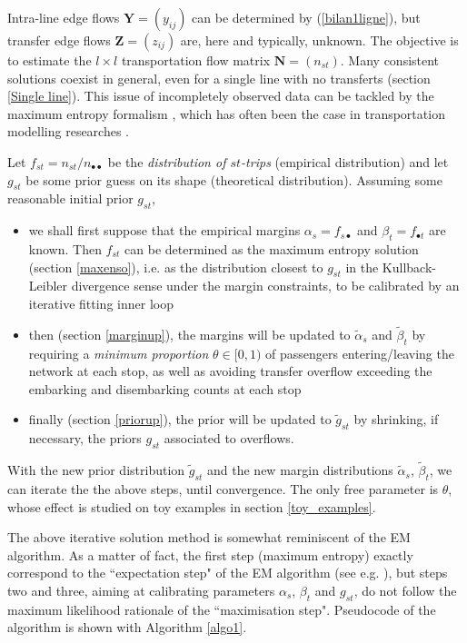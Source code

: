\documentclass{bmcart}
\begin{document}
Intra-line edge flows $\mathbf{Y}=(y_{ij})$ can be determined by (\ref{bilan1ligne}), but transfer edge flows $\mathbf{Z}=(z_{ij})$ are, here and typically, unknown. The objective is to estimate the $l\times l$ transportation flow matrix $\mathbf{N}=(n_{st})$. Many consistent solutions coexist in general, even for a single line with no transferts (section \ref{Single line}). This issue of incompletely observed data can be tackled by the maximum entropy formalism \cite{jaynes1957information}, which has often been the case in transportation modelling researches \cite{wilson1967statistical}  \cite{erlander1990gravity}. 



Let $f_{st}=n_{st}/n_{\bullet\bullet}$ be the \emph{distribution of $st$-trips} (empirical distribution) and let $g_{st}$ be some prior guess on its shape (theoretical distribution). 
Assuming some reasonable initial prior $g_{st}$, 
\begin{itemize}
\item[(1)] we shall first suppose that the empirical margins $\alpha_s=f_{s\bullet}$ and $\beta_t=f_{\bullet t}$ are known.  
Then $f_{st}$ can be determined as the maximum entropy solution (section \ref{maxenso}), i.e. as the distribution closest to $g_{st}$ in the Kullback-Leibler divergence sense under the margin constraints, to be calibrated by an iterative fitting inner loop
\item[(2)] then (section \ref{marginup}), the margins will be updated to $\tilde{\alpha}_s$ and $\tilde{\beta}_t$   by requiring a \emph{minimum proportion} $\theta\in [0,1)$ of passengers entering/leaving the network at each stop, as well as avoiding transfer overflow exceeding the embarking and disembarking counts at each stop
 \item[(3)] finally (section \ref{priorup}), the prior will be updated to $\tilde{g}_{st}$ by shrinking, if necessary, the priors $g_{st}$ associated to overflows. 
\end{itemize}
With the new prior distribution $\widetilde{g}_{st}$ and the new margin distributions $\widetilde{\alpha}_s$, $\widetilde{\beta}_t$, we can iterate the 
 the above steps, until convergence. The only free parameter is $\theta$, whose effect is studied on toy examples in section \ref{toy_examples}.
 
The above iterative solution method is somewhat reminiscent of the EM algorithm. As a matter of fact, the first  step  (maximum entropy) exactly correspond to the ``expectation step" of the EM algorithm (see e.g. \cite{dempster1977maximum}  \cite{bavaud2009information}), but steps two and three, aiming at calibrating parameters $\alpha_s$, $\beta_t$ and $g_{st}$, do not follow the maximum likelihood rationale of the ``maximisation step". Pseudocode of the algorithm is shown with Algorithm \ref{algo1}.
\end{document}
